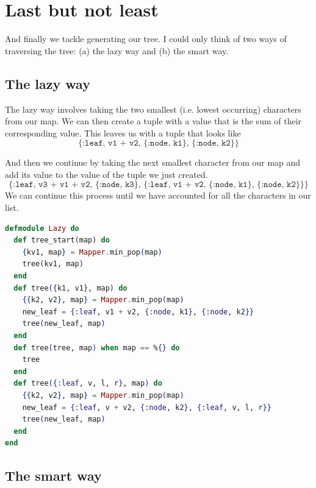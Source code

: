 \section{Last but not least}
And finally we tackle generating our tree. I could only think of two ways of traversing the tree: (a) the lazy way and (b) the smart way.


\subsection{The lazy way}
The lazy way involves taking the two smallest (i.e. lowest occurring) characters from our map. We can then create a tuple with a value that is the sum of their corresponding value. This leaves us with a tuple that looks like
\begin{equation*}
    \texttt{\{:leaf, v1 + v2, \{:node, k1\}, \{:node, k2\}\}}
\end{equation*}

And then we continue by taking the next smallest character from our map and add its value to the value of the tuple we just created.
\begin{equation*}
    \texttt{
        \{:leaf, v3 + v1 + v2, \{:node, k3\},
        \{:leaf, v1 + v2, \{:node, k1\}, \{:node, k2\}\}
        \}
    }
\end{equation*}
We can continue this process until we have accounted for all the characters in our list. 
\pagebreak
\begin{lstlisting}[language=Elixir, title=The lazy way]
defmodule Lazy do
  def tree_start(map) do
    {kv1, map} = Mapper.min_pop(map)
    tree(kv1, map)
  end
  def tree({k1, v1}, map) do
    {{k2, v2}, map} = Mapper.min_pop(map)
    new_leaf = {:leaf, v1 + v2, {:node, k1}, {:node, k2}}
    tree(new_leaf, map)
  end
  def tree(tree, map) when map == %{} do
    tree
  end
  def tree({:leaf, v, l, r}, map) do
    {{k2, v2}, map} = Mapper.min_pop(map)
    new_leaf = {:leaf, v + v2, {:node, k2}, {:leaf, v, l, r}}
    tree(new_leaf, map)
  end
end
\end{lstlisting}


\subsection{The smart way}


